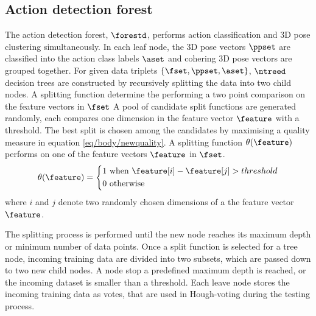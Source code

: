 \subsection{Action detection forest}
\label{sec/body/adflearn}
The action detection forest, $\forestd$, performs action classification and 3D pose clustering simultaneously.  
In each leaf node, the 3D pose vectors $\ppset$ are classified into the action class labels $\aset$ and cohering 3D pose vectors are grouped together.
For given data triplets $\{\fset,\ppset, \aset\}$, $\ntreed$ decision trees are constructed by recursively splitting the data into two child nodes. A splitting function determine the    
performing a two point comparison on the feature vectors in $\fset$   
A pool of candidate split functions are generated randomly, each compares one dimension in the feature vector $\feature$ with a threshold. 
The best split is chosen among the candidates by maximising a quality measure in equation \ref{eq/body/newquality}. A splitting function $\theta(\feature)$ performs on one of the feature vectors $\feature$ in $\fset$.   
\begin{equation}
	\theta(\feature) = 
	\left\{
		\begin{aligned}
			1 & \mbox{ when } \feature[i] - \feature[j] > threshold \\  
			0 & \mbox{ otherwise } 
		\end{aligned}
	\right.
	\label{eqn/body/split}
\end{equation}
where $i$ and $j$ denote two randomly chosen dimensions of a the feature vector $\feature$. 

The splitting process is performed until the new node reaches its maximum depth or minimum number of data points. 
Once a split function is selected for a tree node, incoming training data are divided into two subsets, which are passed down to two new child nodes.  
A node stop a predefined maximum depth is reached, or the incoming dataset is smaller than a threshold. Each leave node stores the incoming training data as votes, that are used in Hough-voting during the testing process. 

